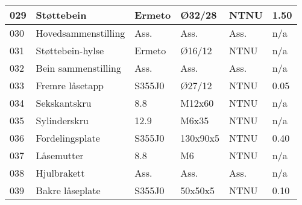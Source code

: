 \begin{tabular}{|l|l|l|l|l|l|}
\hline
	029 & Støttebein & Ermeto & Ø32/28 & NTNU & 1.50 \\ \hline
	030 & Hovedsammenstilling & Ass. & Ass. & Ass. & n/a \\ \hline
	031 & Støttebein-hylse & Ermeto & Ø16/12 & NTNU & n/a \\ \hline
	032 & Bein sammenstilling & Ass. & Ass. & Ass. & n/a \\ \hline
	033 & Fremre låsetapp & S355J0 & Ø27/12 & NTNU & 0.05 \\ \hline
	034 & Sekskantskru & 8.8 & M12x60 & NTNU & n/a \\ \hline
	035 & Sylinderskru & 12.9 & M6x35 & NTNU & n/a \\ \hline
	036 & Fordelingsplate & S355J0 & 130x90x5 & NTNU & 0.40 \\ \hline
	037 & Låsemutter & 8.8 & M6 & NTNU & n/a \\ \hline
	038 & Hjulbrakett & Ass. & Ass. & Ass. & n/a \\ \hline
	039 & Bakre låseplate & S355J0 & 50x50x5 & NTNU & 0.10 \\ \hline
\end{tabular}
